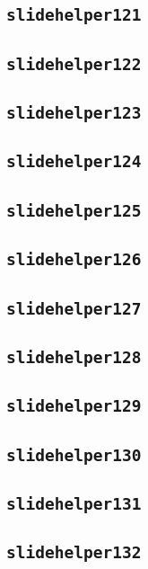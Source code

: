 \subsection{\texttt{slidehelper121}}
\newpage
\subsection{\texttt{slidehelper122}}
\newpage
\subsection{\texttt{slidehelper123}}
\newpage
\subsection{\texttt{slidehelper124}}
\newpage
\subsection{\texttt{slidehelper125}}
\newpage
\subsection{\texttt{slidehelper126}}
\newpage
\subsection{\texttt{slidehelper127}}
\newpage
\subsection{\texttt{slidehelper128}}
\newpage
\subsection{\texttt{slidehelper129}}
\newpage
\subsection{\texttt{slidehelper130}}
\newpage
\subsection{\texttt{slidehelper131}}
\newpage
\subsection{\texttt{slidehelper132}}
\newpage
